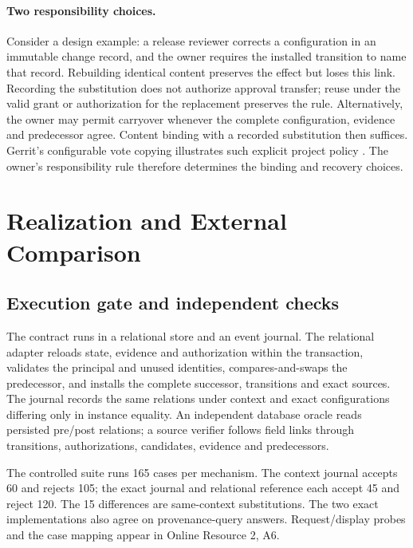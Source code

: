 \paragraph*{Two responsibility choices.}
Consider a design example: a release reviewer corrects a configuration in an immutable change record, and the owner requires the installed transition to name that record. Rebuilding identical content preserves the effect but loses this link. Recording the substitution does not authorize approval transfer; reuse under the valid grant or authorization for the replacement preserves the rule. Alternatively, the owner may permit carryover whenever the complete configuration, evidence and predecessor agree. Content binding with a recorded substitution then suffices. Gerrit's configurable vote copying illustrates such explicit project policy \citep{gerrit-copy-condition}. The owner's responsibility rule therefore determines the binding and recovery choices.

\section{Realization and External Comparison}\label{realization-and-external-comparison}

\subsection{Execution gate and independent checks}\label{execution-gate-and-independent-checks}

The contract runs in a relational store and an event journal. The relational adapter reloads state, evidence and authorization within the transaction, validates the principal and unused identities, compares-and-swaps the predecessor, and installs the complete successor, transitions and exact sources. The journal records the same relations under context and exact configurations differing only in instance equality. An independent database oracle reads persisted pre/post relations; a source verifier follows field links through transitions, authorizations, candidates, evidence and predecessors.

The controlled suite runs 165 cases per mechanism. The context journal accepts 60 and rejects 105; the exact journal and relational reference each accept 45 and reject 120. The 15 differences are same-context substitutions. The two exact implementations also agree on provenance-query answers. Request/display probes and the case mapping appear in Online Resource 2, A6.

